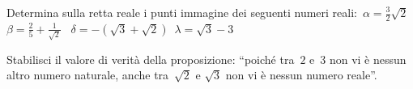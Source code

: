 \begin{comment}
\begin{esercizio}
 \label{ese:D.13}
Assegnata la funzione lineare~\(f:y=m\cdot x+q\), essendo una funzione
iniettiva la sua inversa è:\dotfill
\end{esercizio}

\begin{esercizio}
 \label{ese:D.14}
Date le funzioni~\(f(x)=2x+1\) e~\(g(x)=3x+2\) che hanno per dominio
rispettivamente~\(A=\left\{x\in \insZ/-2\le x\le~2\right\}\),
\(B=\left\{x\in \insZ\text{/}-1\le x\le~3\right\}\)
Scrivi le espressioni analitiche delle funzioni~\(f\circ g\) e~\(g\circ f\)
\end{esercizio}


\end{comment}

\begin{esercizio}
\label{ese:D.15}
Determina sulla retta reale i punti immagine dei seguenti numeri reali:~\(\alpha 
=\frac{3}{2}\sqrt{2}\)\, \(\beta =\frac{2}{5}+\frac{1}{\sqrt{2}}\)
\, \(\delta =-\left(\sqrt{3}+\sqrt{2}\right)\)\, \(\lambda =\sqrt{3}-3\)
\end{esercizio}


\begin{esercizio}
\label{ese:D.17}
Stabilisci il valore di verità della proposizione: ``poiché tra~\(2\) e~\(3\) non vi 
è nessun altro numero naturale, anche tra~\(\sqrt{2}\) e
\(\sqrt{3}\) non vi è nessun numero reale''.
\end{esercizio}


